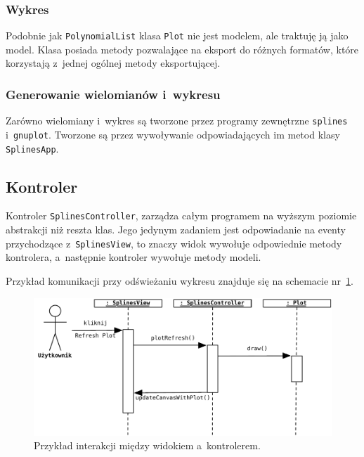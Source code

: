 \documentclass[10pt,a4paper]{article}
\newcommand{\f}[1]{\texttt{#1}}
\begin{document}
\subsubsection{Wykres}

Podobnie jak \f{PolynomialList} klasa \f{Plot} nie jest modelem, ale traktuję
ją jako model. Klasa posiada metody pozwalające na eksport do różnych formatów,
które korzystają z~jednej ogólnej metody eksportującej.

\subsubsection{Generowanie wielomianów i~wykresu}

Zarówno wielomiany i~wykres są tworzone przez programy zewnętrzne \f{splines}
i~\f{gnuplot}. Tworzone są przez wywoływanie odpowiadających im metod klasy
\f{SplinesApp}.

\subsection{Kontroler}

Kontroler \f{SplinesController}, zarządza całym programem na wyższym poziomie
abstrakcji niż reszta klas. Jego jedynym zadaniem jest odpowiadanie na eventy
przychodzące z~\f{SplinesView}, to znaczy widok wywołuje odpowiednie metody
kontrolera, a~następnie kontroler wywołuje metody modeli.

Przykład komunikacji przy odświeżaniu wykresu znajduje się na schemacie
nr~\ref{fig:wykres-rysuj}.

\begin{figure}[ht]
  \begin{adjustwidth}{-2cm}{-2cm}
    \centering
    \includegraphics{figury/wykres-rysuj}
    \caption{Przykład interakcji między widokiem a~kontrolerem.}
    \label{fig:wykres-rysuj}
  \end{adjustwidth}
\end{figure}
\end{document}

